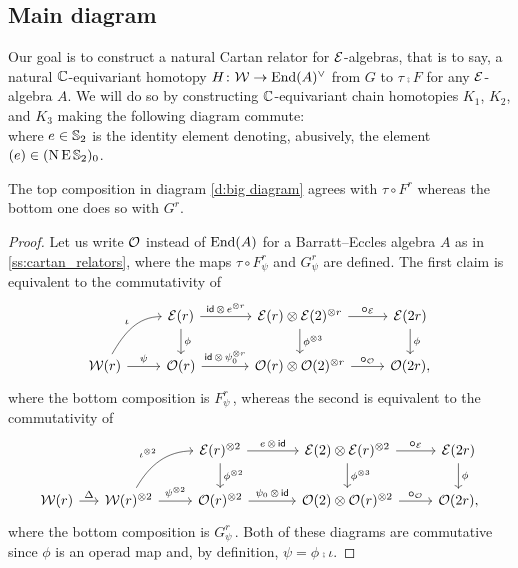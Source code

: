 \subsection{Main diagram}

Our goal is to construct a natural Cartan relator for $\mathcal{E}$-algebras, that is to say, a natural $\mathbb{C}$-equivariant homotopy $H \colon \mathcal{W} \to \mathrm{End}(A)^\vee$ from $G$ to $\tau \comp F$ for any $\mathcal{E}$-algebra $A$.
We will do so by constructing $\mathbb{C}$-equivariant chain homotopies $K_1$, $K_2$, and $K_3$ making the following diagram commute:
\begin{equation}\label{d:big diagram}
	
\end{equation}
where $e \in \mathbb{S}_2$ is the identity element denoting, abusively, the element $(e) \in (\operatorname{N}\operatorname{E}\mathbb{S}_2)_0$.

\begin{lemma}
	The top composition in diagram \eqref{d:big diagram} agrees with $\tau \circ F^r$ whereas the bottom one does so with $G^r$.
\end{lemma}

\begin{proof}
	Let us write $\mathcal{O}$ instead of $\mathrm{End}(A)$ for a Barratt--Eccles algebra $A$ as in  \cref{ss:cartan_relators}, where the maps $\tau \circ F_\psi^r$ and $G_\psi^r$ are defined.
	The first claim is equivalent to the commutativity of
	\[
	\begin{tikzcd}
		&
		\BE(r) \arrow[d,"\phi"] \arrow[r,"\id\, \ot\, e^{\ot r}"] &[10pt]
		\BE(r) \ot \BE(2)^{\ot r} \arrow[d,"\phi^{\ot 3}"] \arrow[r,"\bcirc_{\BE}"] &
		\BE(2r) \arrow[d,"\phi"] \\
		\cW(r) \arrow[r,"\psi"] \arrow[ur, in=180, out=60,"\iota"] &
		\cO(r) \arrow[r,"\id\, \ot\, \psi_0^{\ot r}"] &
		\cO(r) \ot \cO(2)^{\ot r} \arrow[r,"\bcirc_{\cO}"] &
		\cO(2r),
	\end{tikzcd}
	\]
	where the bottom composition is $F_\psi^r$\,, whereas the second is equivalent to the commutativity of
	\[
	\begin{tikzcd}
		&[-10pt] &
		\BE(r)^{\ot2} \arrow[d,"\phi^{\ot 2}"] \arrow[r,"e\,\ot\,\id"] &[10pt]
		\BE(2) \ot \BE(r)^{\ot2} \arrow[d,"\phi^{\ot 3}"] \arrow[r,"\bcirc_{\BE}"] &
		\BE(2r) \arrow[d,"\phi"] \\
		\cW(r) \arrow[r,"\Delta"] &
		\cW(r)^{\ot 2} \arrow[r,"\psi^{\ot 2}"] \arrow[ur, in=180, out=60,"\iota^{\ot 2}"] &
		\cO(r)^{\ot 2} \arrow[r,"\psi_0\,\ot\,\id"] &
		\cO(2) \ot \cO(r)^{\ot 2} \arrow[r,"\bcirc_{\cO}"] &
		\cO(2r),
	\end{tikzcd}
	\]
	where the bottom composition is $G_\psi^r$\,.
	Both of these diagrams are commutative since $\phi$ is an operad map and, by definition, $\psi = \phi \comp \iota$.
\end{proof}

